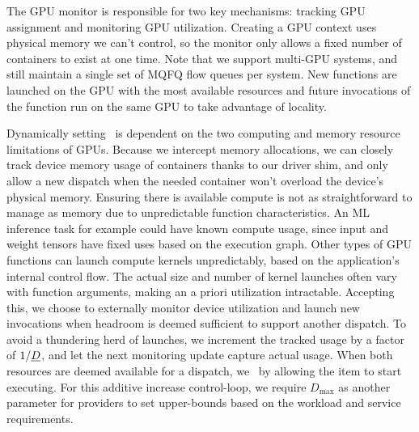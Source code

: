 
The GPU monitor is responsible for two key mechanisms: tracking GPU assignment and monitoring GPU utilization.
Creating a GPU context uses physical memory we can't control, so the monitor only allows a fixed number of containers to exist at one time.
Note that we support multi-GPU systems, and still maintain a single set of MQFQ flow queues per system.  
New functions are launched on the GPU with the most available resources and future invocations of the function run on the same GPU to take advantage of locality. 

Dynamically setting \D~is dependent on the two computing and memory resource limitations of GPUs. 
Because we intercept memory allocations, we can closely track device memory usage of containers thanks to our driver shim, and only allow a new dispatch when the needed container won't overload the device's physical memory. 
Ensuring there is available compute is not as straightforward to manage as memory due to unpredictable function characteristics.
An ML inference task for example could have known compute usage, since input and weight tensors have fixed uses based on the execution graph.
Other types of GPU functions can launch compute kernels unpredictably, based on the application's internal control flow.
The actual size and number of kernel launches often vary with function arguments, making an a priori utilization intractable.
Accepting this, we choose to externally monitor device utilization and launch new invocations when headroom is deemed sufficient to support another dispatch.
To avoid a thundering herd of launches, we increment the tracked usage by a factor of $1/\emph{D}$, and let the next monitoring update capture actual usage.
When both resources are deemed available for a dispatch, we  \D~by allowing the item to start executing.
For this additive increase control-loop, we require $D_{\text{max}}$ as another parameter for providers to set upper-bounds based on the workload and service requirements.





